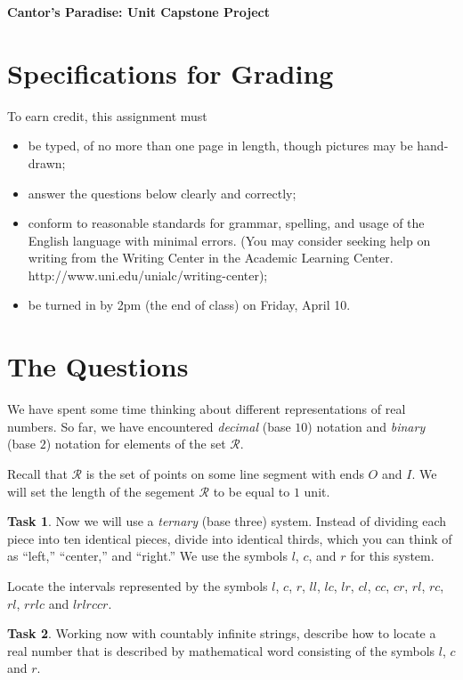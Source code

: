 \documentclass[10pt]{amsart}
\theoremstyle{definition}
\newtheorem{task}{Task}
\begin{document}
\begin{center}
\textbf{\Huge
Cantor's Paradise: Unit Capstone Project
}
\end{center}

\section*{Specifications for Grading}

To earn credit, this assignment must
\begin{itemize}
\item be typed, of no more than one page in length, though pictures may be hand-drawn; 
\item answer the questions below clearly and correctly;
\item conform to reasonable standards for grammar, spelling, and usage of the English language with minimal errors. (You may consider seeking help on writing from the Writing Center in the Academic Learning Center. http://www.uni.edu/unialc/writing-center);
\item be turned in by 2pm (the end of class) on Friday, April 10.
\end{itemize}


\section{The Questions}


We have spent some time thinking about different representations of real numbers.
So far, we have encountered \emph{decimal} (base $10$) notation and \emph{binary} (base $2$) notation for elements of the set $\mathcal{R}$.

Recall that $\mathcal{R}$ is the set of points on some line segment with ends $O$ and $I$. We will set the length of the segement $\mathcal{R}$ to be equal to $1$ unit.

\begin{task}
Now we will use a \emph{ternary} (base three) system. Instead of dividing each piece into ten identical pieces, divide into identical thirds, which you can think of as ``left,'' ``center,'' and ``right.''
We use the symbols $l$, $c$, and $r$ for this system.

Locate the intervals represented by the symbols $l$, $c$, $r$, $ll$, $lc$, $lr$, $cl$, $cc$, $cr$, $rl$, $rc$, $rl$, $rrlc$ and $lrlrccr$.
\end{task}

\begin{task}
Working now with countably infinite strings, describe how to locate a real number that is described by mathematical word consisting of the symbols $l$, $c$ and $r$.\\
\end{task}
\end{document}
